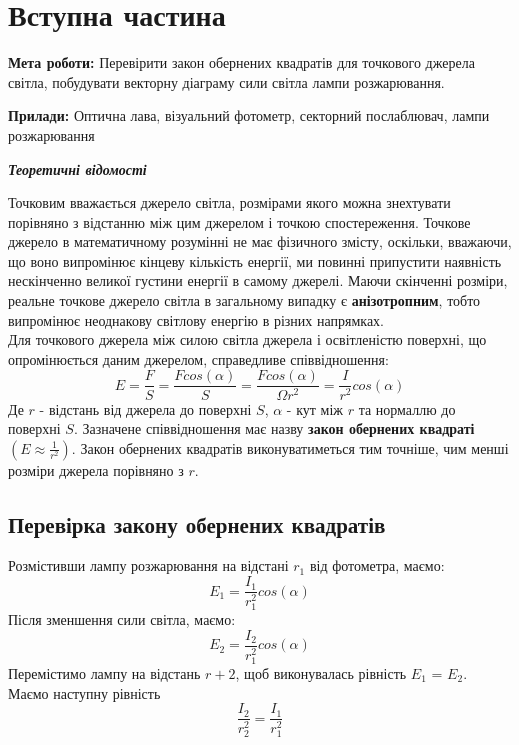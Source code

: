 \section{Вступна частина}
\setlength{\parindent}{4em}
\indent \textbf{Мета роботи:} Перевірити закон обернених квадратів для точкового джерела світла, побудувати векторну
діаграму сили світла лампи розжарювання. \par
\textbf{Прилади:} Оптична лава, візуальний фотометр, секторний послаблювач, лампи розжарювання
\begin{center}
\textbf{\emph{Теоретичні відомості}}
\end{center}
\qquad Точковим вважається джерело світла, розмірами якого
можна знехтувати порівняно з відстанню між цим
джерелом і точкою спостереження. Точкове джерело в
математичному розумінні не має фізичного змісту,
оскільки, вважаючи, що воно випромінює кінцеву
кількість енергії, ми повинні припустити наявність
нескінченно великої густини енергії в самому джерелі.
Маючи скінченні розміри, реальне точкове джерело
світла в загальному випадку є \textbf{анізотропним}, тобто
випромінює неоднакову світлову енергію в різних
напрямках. \\
Для точкового джерела між силою світла джерела і освітленістю поверхні, що опромінюється
даним джерелом, справедливе співвідношення:
$$E = \frac{F}{S} = \frac{F cos(\alpha)}{S} = \frac{F cos(\alpha)}{\Omega r^2} = \frac{I}{r^2} cos(\alpha)$$
Де $r$ - відстань від джерела до поверхні $S$, $\alpha$ - кут між $r$ та нормаллю до поверхні $S$. Зазначене співвідношення має назву \textbf{закон обернених квадраті} $(E \approx \frac{1}{r^2})$. Закон обернених квадратів виконуватиметься тим точніше, чим менші розміри джерела порівняно з $r$.
\subsection{Перевірка закону обернених квадратів}
\qquad Розмістивши лампу розжарювання на відстані $r_1$ від фотометра, маємо:
$$E_1 = \frac{I_1}{r^{2}_1}cos(\alpha)$$
Після зменшення сили світла, маємо:
$$E_2 = \frac{I_2}{r^{2}_1} cos(\alpha)$$
Перемістимо лампу на відстань $r+2$, щоб виконувалась рівність $E_1$ = $E_2$. Маємо наступну рівність
$$\frac{I_2}{r^{2}_2} = \frac{I_1}{r^{2}_1}$$

